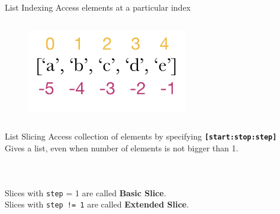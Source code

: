         \begin{frame}{List Indexing}
            \LARGE
            Access elements at a particular index
            \begin{columns}
               \begin{column}{0.5\textwidth}
                \vspace{-5mm}
                \begin{figure}[H]
                    \bigskip
                    \includegraphics[width=70mm]{../Lecture3/code-examples/index.png}
                    \end{figure}    
               \end{column}
               \begin{column}{0.5\textwidth}
                \inputminted[frame=single,framesep=2pt, lastline=8]{python3}{../Lecture3/code-examples/index.py}
               \end{column} 
            \end{columns}
        \end{frame}

        \begin{frame}{List Slicing}
            \LARGE
            Access collection of elements by specifying \textbf{\texttt{[start:stop:step]}}\\
            \pause
            Gives a list, even when number of elements is not bigger than 1.
            \pause
            \normalsize
            \vspace{-2mm}
            \begin{columns}
                \begin{column}{0.5\textwidth}
                    \inputminted[frame=single,framesep=2pt,lastline=9]{python3}{code-examples/slicing.py}                        
                \end{column}                
                \begin{column}{0.5\textwidth}
                    \inputminted[frame=single,framesep=2pt,firstline=10]{python3}{code-examples/slicing.py}                                
                \end{column}
            \end{columns}
            \pause
            \vspace{2mm}
            \LARGE
            Slices with \texttt{step} = 1 are called \textbf{Basic Slice}.\\
            Slices with \texttt{step != 1} are called \textbf{Extended Slice}.
        \end{frame}


